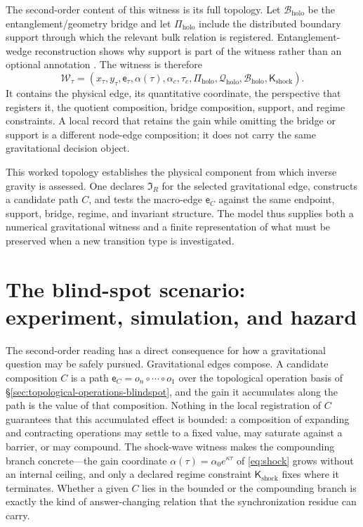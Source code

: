 \documentclass[10pt,twoside,a5paper]{article}
\newcommand{\Bridge}{\ensuremath{\mathcal B}}
\newcommand{\Quot}{\ensuremath{\mathcal Q}}
\newcommand{\Perspective}{\ensuremath{\Pi}}
\newcommand{\Inv}{\ensuremath{\mathfrak I}}
\newcommand{\Edge}{\ensuremath{\mathsf e}}
\newcommand{\Constraint}{\ensuremath{\mathsf K}}
\theoremstyle{definition}
\begin{document}
The second-order content of this witness is its full topology. Let
$\Bridge_{\mathrm{holo}}$ be the entanglement/geometry bridge and let
$\Perspective_{\mathrm{holo}}$ include the distributed boundary support through
which the relevant bulk relation is registered. Entanglement-wedge reconstruction
shows why support is part of the witness rather than an optional annotation
\cite{AlmheiriDongHarlow2015,DongHarlowWall2016}. The witness is therefore
\begin{equation}
\mathcal W_{\tau}=
(x_\tau,y_\tau,\Edge_\tau,\alpha(\tau),\alpha_c,\tau_c,
\Perspective_{\mathrm{holo}},\Quot_{\mathrm{holo}},\Bridge_{\mathrm{holo}},
\Constraint_{\mathrm{shock}}).
\label{eq:witness}
\end{equation}
It contains the physical edge, its quantitative coordinate, the perspective that
registers it, the quotient composition, bridge composition, support, and
regime constraints. A local record that retains the gain while omitting the
bridge or support is a different node-edge composition; it does not carry the
same gravitational decision object.

This worked topology establishes the physical component from which inverse
gravity is assessed. One declares $\Inv_R$ for the selected gravitational edge,
constructs a candidate path $C$, and tests the macro-edge $\Edge_C$ against the
same endpoint, support, bridge, regime, and invariant structure. The model thus
supplies both a numerical gravitational witness and a finite representation of
what must be preserved when a new transition type is investigated.

\section{The blind-spot scenario: experiment, simulation, and hazard}
\label{sec:scenario}

The second-order reading has a direct consequence for how a gravitational question
may be safely pursued. Gravitational edges compose. A candidate composition $C$ is
a path $\Edge_C=o_n\circ\cdots\circ o_1$ over the topological operation basis of
\S\ref{sec:topological-operations-blindspot}, and the gain it accumulates along the
path is the value of that composition. Nothing in the local registration of $C$
guarantees that this accumulated effect is bounded: a composition of expanding and
contracting operations may settle to a fixed value, may saturate against a barrier,
or may compound. The shock-wave witness makes the compounding branch concrete---the
gain coordinate $\alpha(\tau)=\alpha_0 e^{\kappa\tau}$ of \eqref{eq:shock} grows
without an internal ceiling, and only a declared regime constraint
$\Constraint_{\mathrm{shock}}$ fixes where it terminates. Whether a given $C$ lies
in the bounded or the compounding branch is exactly the kind of answer-changing
relation that the synchronization residue can carry.
\end{document}
